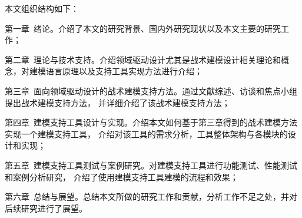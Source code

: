 本文组织结构如下：

第一章~绪论。介绍了本文的研究背景、国内外研究现状以及本文主要的研究工作；

第二章~理论与技术支持。介绍领域驱动设计尤其是战术建模设计相关理论和概念，对建模语言原理以及支持工具实现方法进行介绍；

第三章~面向领域驱动设计的战术建模支持方法。通过文献综述、访谈和焦点小组提出战术建模支持方法，
并详细介绍了该战术建模支持方法；

第四章~建模支持工具设计与实现。介绍本文如何基于第三章得到的战术建模方法实现一个建模支持工具，
介绍对该工具的需求分析，工具整体架构与各模块的设计和实现；

第五章~建模支持工具测试与案例研究。对建模支持工具进行功能测试、性能测试和案例分析研究，
介绍了使用建模支持工具建模的流程和效果；

第六章~总结与展望。总结本文所做的研究工作和贡献，分析工作不足之处，并对后续研究进行了展望。
